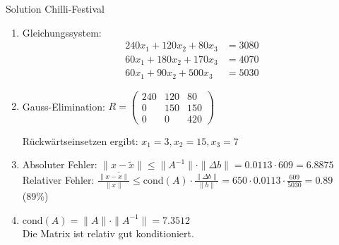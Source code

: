 \begin{KR}{Solution Chilli-Festival}
\begin{enumerate}
    \item Gleichungssystem:
    \begin{align*}
    240x_1 + 120x_2 + 80x_3 &= 3080\\
    60x_1 + 180x_2 + 170x_3 &= 4070\\
    60x_1 + 90x_2 + 500x_3 &= 5030
    \end{align*}
    
    \item Gauss-Elimination:
    $R = \begin{pmatrix}
    240 & 120 & 80\\
    0 & 150 & 150\\
    0 & 0 & 420
    \end{pmatrix}$
    
    Rückwärtseinsetzen ergibt: $x_1 = 3, x_2 = 15, x_3 = 7$
    
    \item Absoluter Fehler: $\|x - \tilde{x}\| \leq \|A^{-1}\| \cdot \|\Delta b\| = 0.0113 \cdot 609 = 6.8875$\\
    Relativer Fehler: $\frac{\|x - \tilde{x}\|}{\|x\|} \leq \text{cond}(A) \cdot \frac{\|\Delta b\|}{\|b\|} = 650 \cdot 0.0113 \cdot \frac{609}{5030} = 0.89$ (89\%)
    
    \item $\text{cond}(A) = \|A\| \cdot \|A^{-1}\| = 7.3512$\\
    Die Matrix ist relativ gut konditioniert.
\end{enumerate}
\end{KR}

